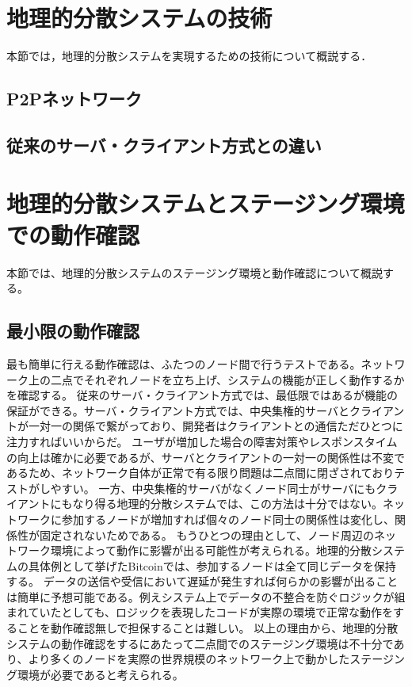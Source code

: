 \section{地理的分散システムの技術}
本節では，地理的分散システムを実現するための技術について概説する．

\subsection{P2Pネットワーク}

\subsection{従来のサーバ・クライアント方式との違い}

\section{地理的分散システムとステージング環境での動作確認}
本節では、地理的分散システムのステージング環境と動作確認について概説する。

\subsection{最小限の動作確認}
最も簡単に行える動作確認は、ふたつのノード間で行うテストである。ネットワーク上の二点でそれぞれノードを立ち上げ、システムの機能が正しく動作するかを確認する。
従来のサーバ・クライアント方式では、最低限ではあるが機能の保証ができる。サーバ・クライアント方式では、中央集権的サーバとクライアントが一対一の関係で繋がっており、開発者はクライアントとの通信ただひとつに注力すればいいからだ。
ユーザが増加した場合の障害対策やレスポンスタイムの向上は確かに必要であるが、サーバとクライアントの一対一の関係性は不変であるため、ネットワーク自体が正常で有る限り問題は二点間に閉ざされておりテストがしやすい。
一方、中央集権的サーバがなくノード同士がサーバにもクライアントにもなり得る地理的分散システムでは、この方法は十分ではない。ネットワークに参加するノードが増加すれば個々のノード同士の関係性は変化し、関係性が固定されないためである。
もうひとつの理由として、ノード周辺のネットワーク環境によって動作に影響が出る可能性が考えられる。地理的分散システムの具体例として挙げたBitcoinでは、参加するノードは全て同じデータを保持する。
データの送信や受信において遅延が発生すれば何らかの影響が出ることは簡単に予想可能である。例えシステム上でデータの不整合を防ぐロジックが組まれていたとしても、ロジックを表現したコードが実際の環境で正常な動作をすることを動作確認無しで担保することは難しい。
以上の理由から、地理的分散システムの動作確認をするにあたって二点間でのステージング環境は不十分であり、より多くのノードを実際の世界規模のネットワーク上で動かしたステージング環境が必要であると考えられる。

